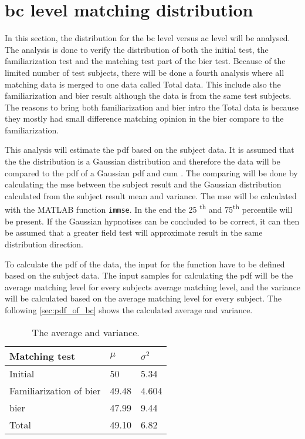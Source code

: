 \section{\gls{bc} level matching distribution}
In this section, the distribution for the \gls{bc} level versus \gls{ac} level will be analysed. The analysis is done to verify the distribution of both the initial test, the familiarization test and the matching test part of the \gls{bier} test. Because of the limited number of test subjects, there will be done a fourth analysis where all matching data is merged to one data called Total data. This include also the familiarization and \gls{bier} result although the data is from the same test subjects. The reasons to bring both familiarization and \gls{bier} intro the Total data is because they mostly had small difference matching opinion in the \gls{bier} compare to the familiarization.


This analysis will estimate the \gls{pdf} based on the subject data. It is assumed that the the distribution is a Gaussian distribution and therefore the data will be compared to the \gls{pdf} of a Gaussian \gls{pdf} and \gls{cum} . The comparing will be done by calculating the \gls{mse} between the subject result and the Gaussian distribution calculated from the subject result mean and variance. The \gls{mse} will be calculated with the MATLAB function \texttt{immse}. In the end the 25 \textsuperscript{th} and 75\textsuperscript{th} percentile will be present. If the Gaussian hypnotises can be concluded to be correct, it can then be assumed that a greater field test will approximate result in the same distribution direction.

To calculate the \gls{pdf} of the data, the input for the function have to be defined based on the subject data. The input samples for calculating the  \gls{pdf} will be the average matching level for every subjects average matching level, and the variance will be calculated based on the average matching level for every subject. The following \autoref{sec:pdf_of_bc} shows the calculated average and variance. 

\begin{table}[H]
\centering
\caption{The average and variance.}
\begin{tabular}{l|ll}
Matching test                 & $\mu$ & $\sigma^2$ \\ \hline
Initial                       & 50    & 5.34       \\
Familiarization of \gls{bier} & 49.48 & 4.604      \\
\gls{bier}                    & 47.99 & 9.44      \\
Total                    & 49.10 & 6.82      
\end{tabular}
\label{sec:pdf_of_bc}
\end{table}

